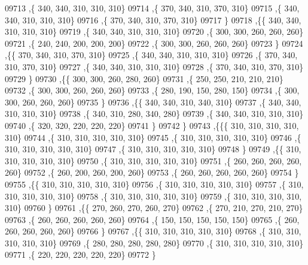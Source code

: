 \begin{DoxyCode}
09713     ,\{   340,   340,   310,   310,   310\}
09714     ,\{   370,   340,   310,   370,   310\}
09715     ,\{   340,   340,   310,   310,   310\}
09716     ,\{   370,   340,   310,   370,   310\}
09717     \}
09718    ,\{\{   340,   340,   310,   310,   310\}
09719     ,\{   340,   340,   310,   310,   310\}
09720     ,\{   300,   300,   260,   260,   260\}
09721     ,\{   240,   240,   200,   200,   200\}
09722     ,\{   300,   300,   260,   260,   260\}
09723     \}
09724    ,\{\{   370,   340,   310,   370,   310\}
09725     ,\{   340,   340,   310,   310,   310\}
09726     ,\{   370,   340,   310,   370,   310\}
09727     ,\{   340,   340,   310,   310,   310\}
09728     ,\{   370,   340,   310,   370,   310\}
09729     \}
09730    ,\{\{   300,   300,   260,   280,   260\}
09731     ,\{   250,   250,   210,   210,   210\}
09732     ,\{   300,   300,   260,   260,   260\}
09733     ,\{   280,   190,   150,   280,   150\}
09734     ,\{   300,   300,   260,   260,   260\}
09735     \}
09736    ,\{\{   340,   340,   310,   340,   310\}
09737     ,\{   340,   340,   310,   310,   310\}
09738     ,\{   340,   310,   280,   340,   280\}
09739     ,\{   340,   340,   310,   310,   310\}
09740     ,\{   320,   320,   220,   220,   220\}
09741     \}
09742    \}
09743   ,\{\{\{   310,   310,   310,   310,   310\}
09744     ,\{   310,   310,   310,   310,   310\}
09745     ,\{   310,   310,   310,   310,   310\}
09746     ,\{   310,   310,   310,   310,   310\}
09747     ,\{   310,   310,   310,   310,   310\}
09748     \}
09749    ,\{\{   310,   310,   310,   310,   310\}
09750     ,\{   310,   310,   310,   310,   310\}
09751     ,\{   260,   260,   260,   260,   260\}
09752     ,\{   260,   200,   260,   200,   260\}
09753     ,\{   260,   260,   260,   260,   260\}
09754     \}
09755    ,\{\{   310,   310,   310,   310,   310\}
09756     ,\{   310,   310,   310,   310,   310\}
09757     ,\{   310,   310,   310,   310,   310\}
09758     ,\{   310,   310,   310,   310,   310\}
09759     ,\{   310,   310,   310,   310,   310\}
09760     \}
09761    ,\{\{   270,   260,   270,   260,   270\}
09762     ,\{   270,   210,   270,   210,   270\}
09763     ,\{   260,   260,   260,   260,   260\}
09764     ,\{   150,   150,   150,   150,   150\}
09765     ,\{   260,   260,   260,   260,   260\}
09766     \}
09767    ,\{\{   310,   310,   310,   310,   310\}
09768     ,\{   310,   310,   310,   310,   310\}
09769     ,\{   280,   280,   280,   280,   280\}
09770     ,\{   310,   310,   310,   310,   310\}
09771     ,\{   220,   220,   220,   220,   220\}
09772     \}

\end{DoxyCode}
